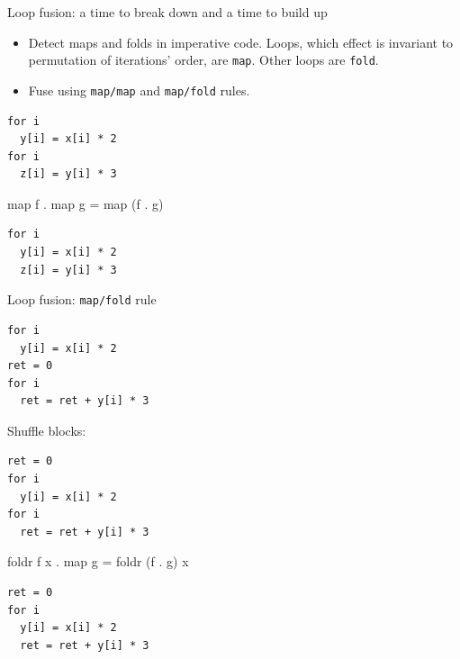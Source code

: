 \documentclass[handout]{beamer}
\begin{document}
\begin{frame}[fragile]{Loop fusion: a time to break down and a time to build up}

\begin{itemize}

\item Detect maps and folds in imperative code. Loops, which effect is invariant to permutation of iterations' order, are {\tt map}. Other loops are {\tt fold}.

\item Fuse using {\tt map/map} and {\tt map/fold} rules.
\end{itemize}

\begin{lstlisting}
for i
  y[i] = x[i] * 2
for i
  z[i] = y[i] * 3
\end{lstlisting}

\centerline{map f . map g = map (f . g)}

\begin{lstlisting}
for i
  y[i] = x[i] * 2
  z[i] = y[i] * 3
\end{lstlisting}

\end{frame}

\begin{frame}[fragile]{Loop fusion: {\tt map/fold} rule}

\vspace{-1ex}

\begin{lstlisting}
for i
  y[i] = x[i] * 2
ret = 0
for i
  ret = ret + y[i] * 3
\end{lstlisting}

Shuffle blocks:

\begin{lstlisting}
ret = 0
for i
  y[i] = x[i] * 2
for i
  ret = ret + y[i] * 3
\end{lstlisting}

\centerline{foldr f x . map g = foldr (f . g) x}

\begin{lstlisting}
ret = 0
for i
  y[i] = x[i] * 2
  ret = ret + y[i] * 3
\end{lstlisting}

\end{frame}
\end{document}
